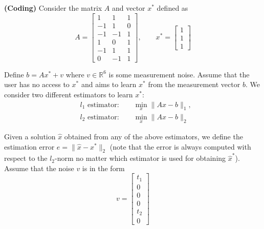 \begin{homeworkProblem}
    
    \textbf{(Coding)} Consider the matrix $A$ and vector $x^*$ defined as
    \begin{equation}
        A = \left[ \begin{array}{ccc} 
            1 & 1 & 1 \\ 
            -1& 1 & 0 \\ 
            -1& -1& 1 \\ 
            1 & 0 & 1 \\ 
            -1& 1 & 1 \\ 
            0 & -1& 1 \end{array}
            \right], \qquad 
        x^* = \left[ \begin{array}{ccc} 
            1 \\ 
            1 \\ 
            1 \end{array}
            \right]
    \end{equation}
 
    Define $b = Ax^* + v$ where $v \in \mathbb R^6$ is some measurement noise. 
    Assume that the user has no access to $x^*$ and aims to learn $x^*$ from 
    the measurement vector $b$. We consider two different estimators to learn 
    $x^*$:
    \begin{subequations}
        \begin{align}
            &\text{$l_1$ estimator:} \qquad \min_x \|Ax-b\|_1, \\
            &\text{$l_2$ estimator:} \qquad \min_x \|Ax-b\|_2
        \end{align}
    \end{subequations}

    Given a solution $\hat x$ obtained from any of the above estimators, we 
    define the estimation error $e = \|\hat x-x^*\|_2$ (note that the error 
    is always computed with respect to the $l_2$-norm no matter which estimator 
    is used for obtaining $\hat x^*$). Assume that the noise $v$ is in the form
    \begin{equation}
        v = \left[ \begin{array}{ccc}  
            t_1 \\ 
            0   \\ 
            0   \\ 
            0   \\ 
            t_2 \\ 
            0   \end{array} \right]
    \end{equation}


\end{homeworkProblem}
